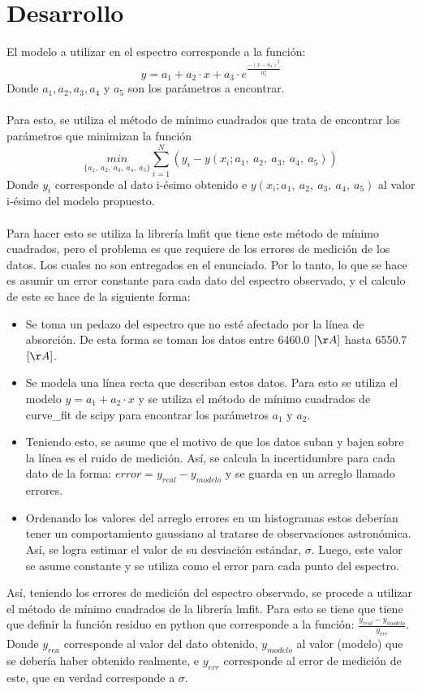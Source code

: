 \documentclass[letterpaper,oneside]{article}
\begin{document}
\newpage
\section{Desarrollo}
El modelo a utilizar en el espectro corresponde a la función:
$$y = a_1+ a_2\cdot x+ a_3\cdot e^{\frac{-(x-a_4)^2}{a_5^2}}$$
Donde $a_1, a_2, a_3, a_4$ y $a_5$ son los parámetros a encontrar.
\\ \\
Para esto, se utiliza el método de mínimo cuadrados que trata de encontrar los parámetros que minimizan la función
$$ \underset{\{a_1,~a_2,~a_3,~a_4,~a_5 \}}{min}\sum ^{N}_{i=1}(y_i-y(x_i;a_1,~a_2,~a_3,~a_4,~a_5 ))$$
Donde $y_i$ corresponde al dato i-ésimo obtenido e $y(x_i;a_1,~a_2,~a_3,~a_4,~a_5)$ al valor i-ésimo del modelo propuesto.
\\ \\
Para hacer esto se utiliza la librería lmfit que tiene este método de mínimo cuadrados, pero el problema es que requiere de los errores de medición de los datos. Los cuales no son entregados en el enunciado. Por lo tanto, lo que se hace es asumir un error constante para cada dato del espectro observado, y el calculo de este se hace de la siguiente forma:
\begin{itemize}
    \item Se toma un pedazo del espectro que no esté afectado por la línea de absorción. De esta forma se toman los datos entre 6460.0 $[\AA]$ hasta 6550.7 $[\AA]$.
    \item Se modela una línea recta que describan estos datos. Para esto se utiliza el modelo $y=a_1+a_2 \cdot x$ y se utiliza el método de mínimo cuadrados de curve\_fit de scipy para encontrar los parámetros $a_1$ y $a_2$. 
    \item Teniendo esto, se asume que el motivo de que los datos suban y bajen sobre la línea es el ruido de medición. Así, se calcula la incertidumbre para cada dato de la forma: $error = y_{real}-y_{modelo}$ y se guarda en un arreglo llamado errores.
    \item Ordenando los valores del arreglo errores en un histogramas estos deberían tener un comportamiento gaussiano al tratarse de observaciones astronómica. Así, se logra estimar el valor de su desviación estándar, $\sigma$. Luego, este valor se asume constante y se utiliza como el error para cada punto del espectro.
\end{itemize}
Así, teniendo los errores de medición del espectro observado, se procede a utilizar el método de mínimo cuadrados de la librería lmfit. Para esto se tiene que tiene que definir la función residuo en python que corresponde a la función: $\frac{y_{real}-y_{modelo}}{y_{err}}$. Donde $y_{rea}$ corresponde al valor del dato obtenido, $y_{modelo}$ al valor (modelo) que se debería haber obtenido realmente, e $y_{err}$ corresponde al error de medición de este, que en verdad corresponde a $\sigma$.\\ \\
\end{document}
